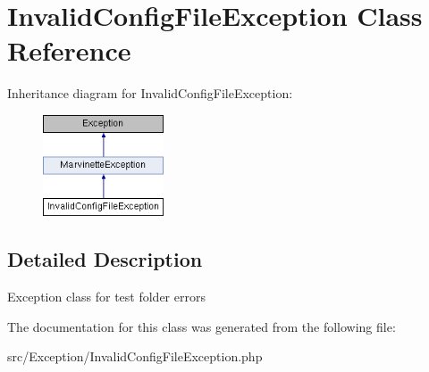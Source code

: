 \hypertarget{classInvalidConfigFileException}{}\section{Invalid\+Config\+File\+Exception Class Reference}
\label{classInvalidConfigFileException}
Inheritance diagram for Invalid\+Config\+File\+Exception\+:\begin{figure}[H]
\begin{center}
\leavevmode
\includegraphics[height=3.000000cm]{classInvalidConfigFileException}
\end{center}
\end{figure}


\subsection{Detailed Description}
Exception class for test folder errors 

The documentation for this class was generated from the following file\+:\begin{DoxyCompactItemize}
\item 
src/\+Exception/Invalid\+Config\+File\+Exception.\+php\end{DoxyCompactItemize}
